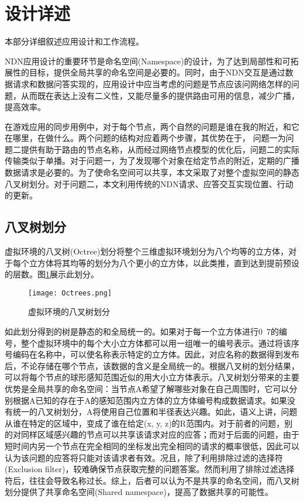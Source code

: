 \section{设计详述}
\par
本部分详细叙述应用设计和工作流程。
\par
NDN应用设计的重要环节是命名空间(Namespace)的设计，为了达到局部性和可拓展性的目标，提供全局共享的命名空间是必要的。同时，由于NDN交互是通过数据请求和数据问答实现的，应用设计中应当考虑的问题是节点应该问网络怎样的问题，从而既在表达上没有二义性，又能尽量多的提供路由可用的信息，减少广播，提高效率。
\par
在游戏应用的同步用例中，对于每个节点，两个自然的问题是谁在我的附近，和它在哪里，在做什么。两个问题的结构对应着两个步骤，其优势在于， 问题一为问题二提供有助于路由的节点名称，从而经过网络节点模型的优化后，问题二的实际传输类似于单播。对于问题一，为了发现哪个对象在给定节点的附近，定期的广播数据请求是必要的。为了使命名空间可以共享，本文采取了对整个虚拟空间的静态八叉树划分。对于问题二，本文利用传统的NDN请求、应答交互实现位置、行动的更新。
\subsection{八叉树划分}
\par
虚拟环境的八叉树(Octree)\cite{OctreeRef}划分将整个三维虚拟环境划分为八个均等的立方体，对于每个立方体将其均等的划分为八个更小的立方体，以此类推，直到达到提前预设的层数。图\ref{fig:Octree}展示此划分。
\begin{figure}[h!]
	\centering
	\texttt{[image: Octrees.png]}
	\caption{虚拟环境的八叉树划分}
	\label{fig:Octree}
\end{figure}
\par
如此划分得到的树是静态的和全局统一的。如果对于每一个立方体进行0~7的编号，整个虚拟环境中的每个大小立方体都可以用一组唯一的编号表示。通过将该序号编码在名称中，可以使名称表示特定的立方体。因此，对应名称的数据得到发布后，不论存储在哪个节点，该数据的含义是全局统一的。根据八叉树的划分结果，可以将每个节点的球形感知范围近似的用大小立方体表示。八叉树划分带来的主要优势是全局共享的命名空间：当节点A希望了解哪些对象在自己周围时，它可以分别根据A已知的存在于A的感知范围内立方体的立方体编号构成数据请求。如果没有统一的八叉树划分，A将使用自己位置和半径表达兴趣。如此，语义上讲，问题从谁在特定的区域中，变成了谁在给定(x, y, z)的R范围内。对于前者的问题，别的对同样区域感兴趣的节点可以共享该请求对应的应答；而对于后面的问题，由于短时间内另一个节点在完全相同的坐标发出完全相同的请求的概率很低，因此可以认为该问题的应答将只能对该请求者有效。况且，除了利用排除过滤的选择符(Exclusion filter)，较难确保节点获取完整的问题答案。然而利用了排除过滤选择符后，往往会导致名称过长。综上，后者可以认为不是共享的命名空间，而八叉树划分提供了共享命名空间(Shared namespace)，提高了数据共享的可能性。 
